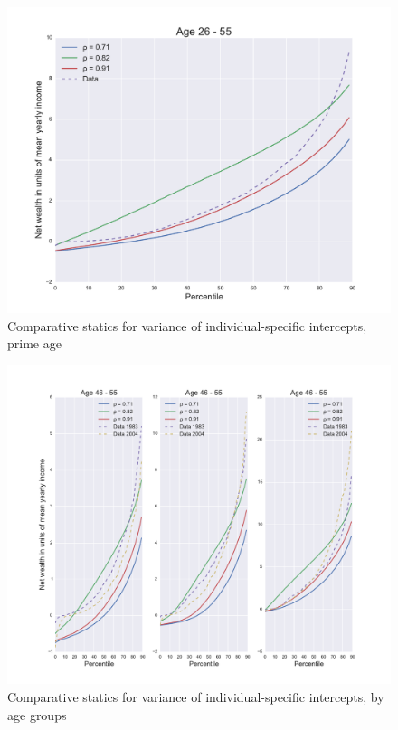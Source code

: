 \begin{figure}
\includegraphics[width=\columnwidth]{comp_stat_rho}
\caption{Comparative statics for variance of individual-specific intercepts, prime age}
\label{fig:comp_stat_rho}
\end{figure}

\begin{figure}
\includegraphics[width=\columnwidth]{comp_stat_rho_agedetail}
\caption{Comparative statics for variance of individual-specific intercepts, by age groups}
\label{fig:comp_stat_rho_agedetail}
\end{figure}

